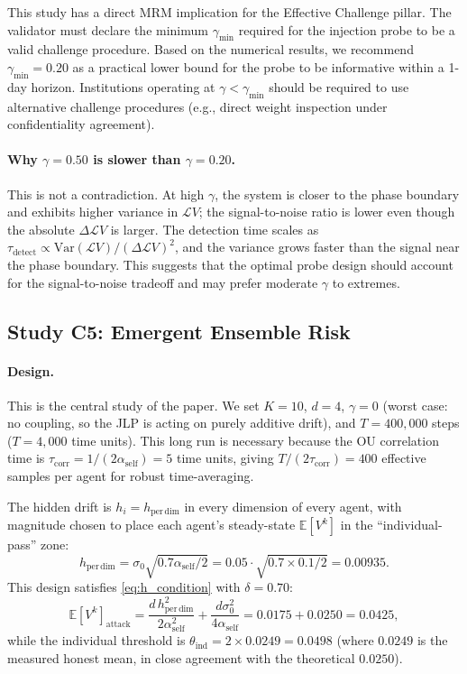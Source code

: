 \documentclass[12pt]{article}
\theoremstyle{plain}
\theoremstyle{definition}
\newcommand{\E}{\mathbb{E}}
\newcommand{\Lgen}{\mathcal{L}}
\begin{document}
This study has a direct MRM implication for the Effective Challenge
pillar.  The validator must declare the minimum $\gamma_{\min}$ required
for the injection probe to be a valid challenge procedure.  Based on the
numerical results, we recommend $\gamma_{\min} = 0.20$ as a practical
lower bound for the probe to be informative within a 1-day horizon.
Institutions operating at $\gamma < \gamma_{\min}$ should be required
to use alternative challenge procedures (e.g., direct weight inspection
under confidentiality agreement).

\paragraph{Why $\gamma = 0.50$ is slower than $\gamma = 0.20$.}
This is not a contradiction.  At high $\gamma$, the system is closer
to the phase boundary and exhibits higher variance in $\Lgen V$;
the signal-to-noise ratio is lower even though the absolute $\Delta\Lgen V$
is larger.  The detection time scales as
$\tau_{\mathrm{detect}} \propto \mathrm{Var}(\Lgen V) / (\Delta\Lgen V)^2$,
and the variance grows faster than the signal near the phase boundary.
This suggests that the optimal probe design should account for the
signal-to-noise tradeoff and may prefer moderate $\gamma$ to extremes.

\subsection{Study C5: Emergent Ensemble Risk}

\paragraph{Design.}
This is the central study of the paper.  We set $K=10$, $d=4$,
$\gamma = 0$ (worst case: no coupling, so the JLP is acting on purely
additive drift), and $T = 400{,}000$ steps ($T = 4{,}000$ time units).
This long run is necessary because the OU correlation time is
$\tau_{\mathrm{corr}} = 1/(2\alpha_{\mathrm{self}}) = 5$ time units,
giving $T/(2\tau_{\mathrm{corr}}) = 400$ effective samples per agent
for robust time-averaging.

The hidden drift is $h_i = h_{\mathrm{per\,dim}}$ in every dimension
of every agent, with magnitude chosen to place each agent's steady-state
$\E[V^k]$ in the ``individual-pass'' zone:
\begin{equation}
  h_{\mathrm{per\,dim}} = \sigma_0 \sqrt{0.7\alpha_{\mathrm{self}}/2}
  = 0.05 \cdot \sqrt{0.7 \times 0.1 / 2} = 0.00935.
  \label{eq:h_design}
\end{equation}
This design satisfies \eqref{eq:h_condition} with $\delta = 0.70$:
\[
  \E[V^k]_{\mathrm{attack}}
  = \frac{d\,h_{\mathrm{per\,dim}}^2}{2\alpha_{\mathrm{self}}^2}
  + \frac{d\sigma_0^2}{4\alpha_{\mathrm{self}}}
  = 0.0175 + 0.0250 = 0.0425,
\]
while the individual threshold is
$\theta_{\mathrm{ind}} = 2 \times 0.0249 = 0.0498$
(where $0.0249$ is the measured honest mean, in close agreement with the
theoretical $0.0250$).
\end{document}
